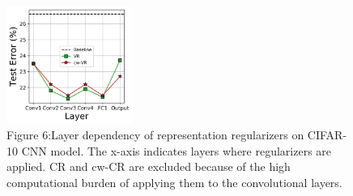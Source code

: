 \begin{figure}[htbp]
\begin{center}
\centerline{\includegraphics[width=4.1cm]{layer_cifar10.png}}
\captionsetup{labelformat=empty}
\caption{Figure 6:Layer dependency of representation regularizers on CIFAR-10 CNN model. The x-axis indicates layers where regularizers are applied. CR and cw-CR are excluded because of the high computational burden of applying them to the convolutional layers.}
\label{fig:layer_dependency_cifar10}
\end{center}
\end{figure}




